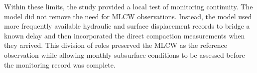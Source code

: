 Within these limits, the study provided a local test of monitoring continuity. The model did not remove the need for MLCW observations. Instead, the model used more frequently available hydraulic and surface displacement records to bridge a known delay and then incorporated the direct compaction measurements when they arrived. This division of roles preserved the MLCW as the reference observation while allowing monthly subsurface conditions to be assessed before the monitoring record was complete.

\FloatBarrier

